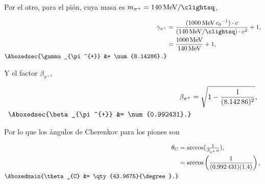 \documentclass[./../main.tex]{subfiles}
\begin{document}
\begin{exercise}
\begin{solution}
			Por el otro, para el pión, cuya masa es \(m_{\pi^{+}} = \qty{140}{\MeV\per\clightsq}\),

			\begin{align*}
				\gamma_{\pi^{+}} &= \dfrac{(\qty{1000}{\MeV\per\clight})\cdot c}{(\qty{140}{\MeV\per\clightsq})\cdot c^{2}} + 1,\\
				&= \dfrac{\qty{1000}{\MeV}}{\qty{140}{\MeV}} + 1,\\
				\Aboxedsec{\gamma_{\pi^{+}} &= \num{8.14286}.}
			\end{align*}

			Y el factor \(\beta_{\pi^{+}}\),
			

			\begin{align*}
				\beta_{\pi^{+}} &= \sqrt{1 - \dfrac{1}{(\num{8.14286})^{2}}},\\
				\Aboxedsec{\beta_{\pi^{+}} &= \num{0.992431}.}
			\end{align*}

			Por lo que los ángulos de Cherenkov para los piones son

			\begin{align*}
				\theta_{C} &= \arccos(\tfrac{1}{\beta_{\pi^{+}} n}),\\
				&= \arccos\left(\dfrac{1}{(\num{0.992431})(1.4)}\right),\\
				\Aboxedmain{\theta_{C} &= \qty{43.9675}{\degree}.}
			\end{align*}
		\end{solution}
	\end{exercise}
\end{document}
